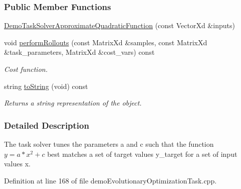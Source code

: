 \subsubsection*{Public Member Functions}
\begin{DoxyCompactItemize}
\item 
\hyperlink{classDemoTaskSolverApproximateQuadraticFunction_ae4813da940a633221713aba3a12615c3}{Demo\+Task\+Solver\+Approximate\+Quadratic\+Function} (const Vector\+Xd \&inputs)
\item 
void \hyperlink{classDemoTaskSolverApproximateQuadraticFunction_a51858a828b9e28eb72c39cc0bd212217}{perform\+Rollouts} (const Matrix\+Xd \&samples, const Matrix\+Xd \&task\+\_\+parameters, Matrix\+Xd \&cost\+\_\+vars) const 
\begin{DoxyCompactList}\small\item\em Cost function. \end{DoxyCompactList}\item 
string \hyperlink{classDemoTaskSolverApproximateQuadraticFunction_a1aca816b42cf0d36118be0ab91120d77}{to\+String} (void) const 
\begin{DoxyCompactList}\small\item\em Returns a string representation of the object. \end{DoxyCompactList}\end{DoxyCompactItemize}


\subsubsection{Detailed Description}
The task solver tunes the parameters a and c such that the function $ y = a*x^2 + c $ best matches a set of target values y\+\_\+target for a set of input values x. 

Definition at line 168 of file demo\+Evolutionary\+Optimization\+Task.\+cpp.



